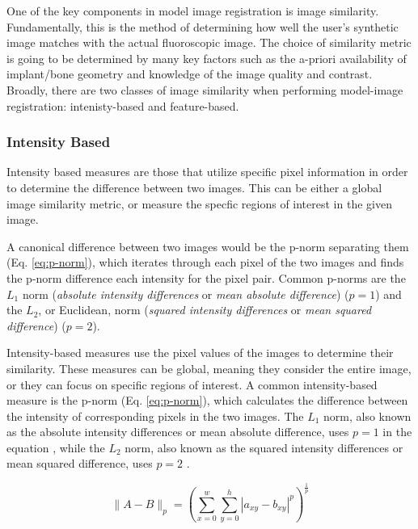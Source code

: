 One of the key components in model image registration is image similarity. Fundamentally, this is the method of determining how well the user's synthetic image matches with the actual fluoroscopic image. The choice of similarity metric is going to be determined by many key factors such as the a-priori availability of implant/bone geometry and knowledge of the image quality and contrast. Broadly, there are two classes of image similarity when performing model-image registration: intenisty-based and feature-based.

\subsubsection{Intensity Based}
Intensity based measures are those that utilize specific pixel information in order to determine the difference between two images. This can be either a global image similarity metric, or measure the specfic regions of interest in the given image. 

A canonical difference between two images would be the p-norm separating them (Eq. \ref{eq:p-norm}), which iterates through each pixel of the two images and finds the p-norm difference each intensity for the pixel pair. Common p-norms are the $L_1$ norm (\emph{absolute intensity differences} or \emph{mean absolute difference}) \cite{kanadeStereoMatchingAlgorithm1994} ($p=1$) and the $L_{2}$, or Euclidean, norm (\emph{squared intensity differences} or \emph{mean squared difference}) \cite{hannahComputerMatchingAreas1977}($p=2$).

Intensity-based measures use the pixel values of the images to determine their similarity. These measures can be global, meaning they consider the entire image, or they can focus on specific regions of interest. A common intensity-based measure is the p-norm (Eq. \ref{eq:p-norm}), which calculates the difference between the intensity of corresponding pixels in the two images. The $L_1$ norm, also known as the absolute intensity differences or mean absolute difference, uses $p=1$ in the equation \cite{kanadeStereoMatchingAlgorithm1994}, while the $L_2$ norm, also known as the squared intensity differences or mean squared difference, uses $p=2$ \cite{hannahComputerMatchingAreas1977}. 

\begin{equation}
    \|A-B\|_{p} = (\sum_{x=0}^{w}\sum_{y=0}^{h}|a_{xy}-b_{xy}|^{p})^{\frac{1}{p}}
    \label{eq:p-norm}
\end{equation}

